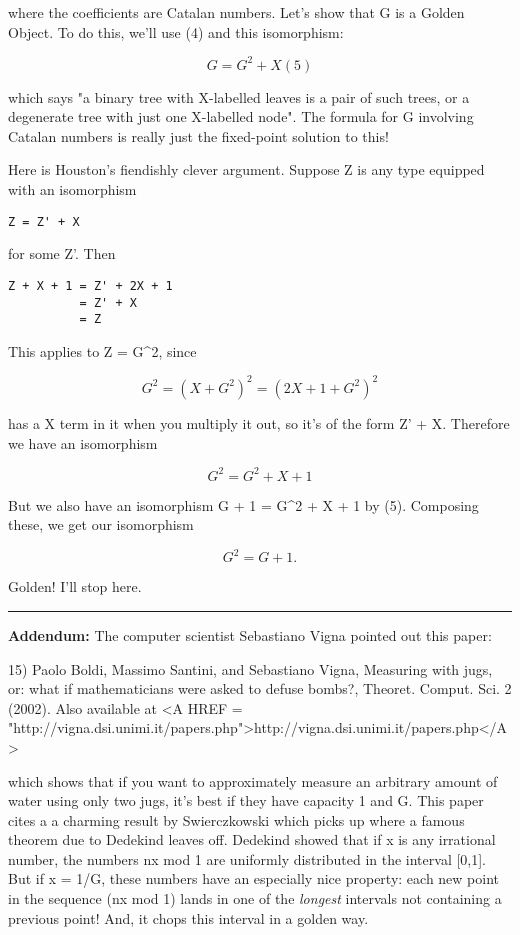where the coefficients are Catalan numbers.  Let's show that G is a 
Golden Object.  To do this, we'll use (4) and this isomorphism:

$$
G = G^{2} + X                               (5)
$$
    
which says "a binary tree with X-labelled leaves is a pair of such
trees, or a degenerate tree with just one X-labelled node".  The formula
for G involving Catalan numbers is really just the fixed-point solution 
to this!

Here is Houston's fiendishly clever argument.  Suppose Z is any type 
equipped with an isomorphism 

\begin{verbatim}
Z = Z' + X 
\end{verbatim}
    
for some Z'.  Then 

\begin{verbatim}
Z + X + 1 = Z' + 2X + 1 
          = Z' + X  
          = Z 
\end{verbatim}
    
This applies to Z = G^{2}, since

$$
G^{2} = (X + G^{2})^{2} = (2X + 1 + G^{2})^{2} 
$$
    
has a X term in it when you multiply it out, so it's of the form Z' + X.
Therefore we have an isomorphism

$$
G^{2} = G^{2} + X + 1
$$
    
But we also have an isomorphism G + 1 = G^{2} + X + 1 by (5).  Composing
these, we get our isomorphism

$$
G^{2} = G + 1.
$$
    
Golden!  I'll stop here.

\par\noindent\rule{\textwidth}{0.4pt}
\textbf{Addendum:} The computer
scientist Sebastiano Vigna pointed out this paper:

15) Paolo Boldi, Massimo Santini, and Sebastiano Vigna,
Measuring with jugs, or: what if mathematicians were asked
to defuse bombs?, Theoret. Comput. Sci. 2 (2002).
Also available at <A HREF = "http://vigna.dsi.unimi.it/papers.php">http://vigna.dsi.unimi.it/papers.php</A>

which shows that if you want to approximately measure an 
arbitrary amount of water using only two jugs, it's best if
they have capacity 1 and G.   This paper cites a
a charming result by Swierczkowski which picks up where a
famous theorem due to Dedekind leaves off.  
Dedekind showed that if x is any irrational number, the numbers
nx mod 1 are uniformly distributed in the interval [0,1].  But
if x = 1/G, these numbers have an especially nice property:
each new point in the sequence
(nx mod 1) lands in one of the \emph{longest} intervals
not containing a previous point!  And, it chops this
interval in a golden way.  

